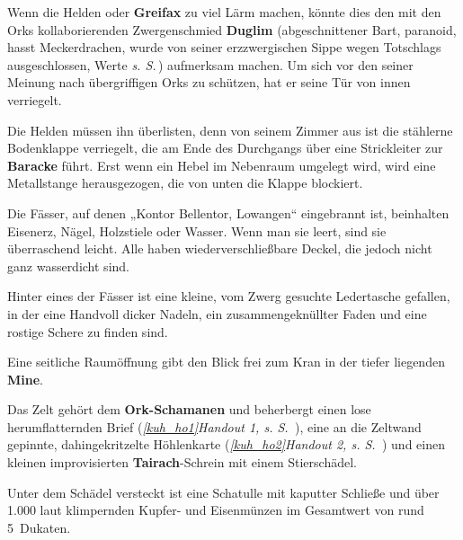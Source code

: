 Wenn die Helden oder \textbf{Greifax} zu viel Lärm machen, könnte dies den mit den Orks kollaborierenden Zwergenschmied \textbf{Duglim} (abgeschnittener Bart, paranoid, hasst Meckerdrachen, wurde von seiner erzzwergischen Sippe wegen Totschlags ausgeschlossen, Werte \emph{s. S.\,\pageref{duglim}}) aufmerksam machen.
Um sich vor den seiner Meinung nach übergriffigen Orks zu schützen, hat er seine Tür von innen verriegelt.

Die Helden müssen ihn überlisten, denn von seinem Zimmer aus ist die stählerne Bodenklappe verriegelt, die am Ende des Durchgangs über eine Strickleiter zur \textbf{Baracke} führt.
Erst wenn ein Hebel im Nebenraum umgelegt wird, wird eine Metallstange herausgezogen, die von unten die Klappe blockiert.


Die Fässer, auf denen „Kontor Bellentor, Lowangen“ eingebrannt ist, beinhalten Eisenerz, Nägel, Holzstiele oder Wasser.
Wenn man sie leert, sind sie überraschend leicht.
Alle haben wiederverschließbare Deckel, die jedoch nicht ganz wasserdicht sind.

Hinter eines der Fässer ist eine kleine, vom Zwerg gesuchte Ledertasche gefallen, in der eine Handvoll dicker Nadeln, ein zusammengeknüllter Faden und eine rostige Schere zu finden sind.

Eine seitliche Raumöffnung gibt den Blick frei zum Kran in der tiefer liegenden \textbf{Mine}.


Das Zelt gehört dem \textbf{Ork-Schamanen} und beherbergt einen lose herumflatternden Brief (\emph{\ref{kuh_ho1}{Handout 1}, s. S. \,\pageref{kuh_ho1}}),
eine an die Zeltwand gepinnte, dahingekritzelte Höhlenkarte (\emph{\ref{kuh_ho2}{Handout 2}, s. S. \,\pageref{kuh_ho2}}) und einen kleinen improvisierten \textbf{Tairach}-Schrein mit einem Stierschädel. %
		
Unter dem Schädel versteckt ist eine Schatulle mit kaputter Schließe und über 1.000 laut klimpernden Kupfer- und Eisenmünzen im Gesamtwert von rund 5~Dukaten.


